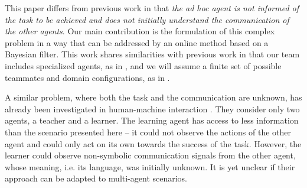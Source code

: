 This paper differs from previous work in that \textit{the ad hoc agent is not informed of the task to be achieved and does not initially understand the communication of the other agents}. Our main contribution is the formulation of this complex problem in a way that can be addressed by an online method based on a Bayesian filter. This work shares similarities with previous work in that our team includes specialized agents, as in \cite{genter2011role}, and we will assume a finite set of possible teammates and domain configurations, as in \cite{genter2011role,barrett2011empirical,barrett2014communicating}.


A similar problem, where both the task and the communication are unknown, has already been investigated in human-machine interaction \cite{grizou2014interactive}. They consider only two agents, a teacher and a learner. The learning agent has access to less information than the scenario presented here -- it could not observe the actions of the other agent and could only act on its own towards the success of the task. However, the learner could observe non-symbolic communication signals from the other agent, whose meaning, i.e. its language, was initially unknown. It is yet unclear if their approach can be adapted to multi-agent scenarios.



